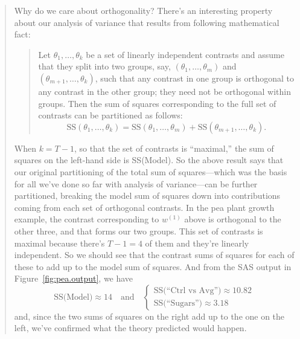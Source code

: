 \documentclass[a4paper, 12pt]{article}
\theoremstyle{plain}
\theoremstyle{definition}
\theoremstyle{remark}
\begin{document}
\begin{quote}
Why do we care about orthogonality?  There's an interesting property about our analysis of variance that results from following mathematical fact:
\begin{quote}
Let $\theta_1,\ldots,\theta_k$ be a set of linearly independent contrasts and assume that they split into two groups, say, $(\theta_1,\ldots,\theta_m)$ and $(\theta_{m+1},\ldots,\theta_k)$, such that any contrast in one group is orthogonal to any contrast in the other group; they need not be orthogonal within groups.  Then the sum of squares corresponding to the full set of contrasts can be partitioned as follows:
\[ \text{SS}(\theta_1,\ldots,\theta_k) = \text{SS}(\theta_1,\ldots,\theta_m) + \text{SS}(\theta_{m+1},\ldots,\theta_k). \]
\end{quote}
When $k=T-1$, so that the set of contrasts is ``maximal,'' the sum of squares on the left-hand side is SS(Model).  So the above result says that our original partitioning of the total sum of squares---which was the basis for all we've done so far with analysis of variance---can be further partitioned, breaking the model sum of squares down into contributions coming from each set of orthogonal contrasts.  In the pea plant growth example, the contrast corresponding to $w^{(1)}$ above is orthogonal to the other three, and that forms our two groups.  This set of contrasts is maximal because there's $T-1=4$ of them and they're linearly independent.  So we should see that the contrast sums of squares for each of these to add up to the model sum of squares.  And from the SAS output in Figure~\ref{fig:pea.output}, we have 
\[ \text{SS(Model)} \approx 14 \quad \text{and} \quad \begin{cases} \text{SS(``Ctrl vs Avg'')} \approx 10.82 \\ \text{SS(``Sugars'')} \approx 3.18 \end{cases} \]
and, since the two sums of squares on the right add up to the one on the left, we've confirmed what the theory predicted would happen.  
\end{quote}
\end{document}
